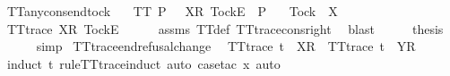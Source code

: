 \begin{isabellebody}
{\isafoldproof}%
%
\isadelimproof
\isanewline
%
\endisadelimproof
\isanewline
{}\isamarkupfalse%
\ TT{}{\isacharunderscore}any{\isacharunderscore}cons{\isacharunderscore}end{\isacharunderscore}tock{\isacharcolon}\isanewline
\ \ \ {\isachardoublequoteopen}TT{}\ P{\isachardoublequoteclose}\ {\isachardoublequoteopen}{\isasymrho}\ {\isacharat}\ {\isacharbrackleft}{\isacharbrackleft}X{\isacharbrackright}\isactrlsub R{\isacharcomma}\ {\isacharbrackleft}Tock{\isacharbrackright}\isactrlsub E{\isacharbrackright}\ {\isasymin}\ P{\isachardoublequoteclose}\isanewline
\ \ \ {\isachardoublequoteopen}Tock\ {\isasymnotin}\ X{\isachardoublequoteclose}\isanewline
%
\isadelimproof
%
\endisadelimproof
%
\isatagproof
{}\isamarkupfalse%
\ {\isacharminus}\isanewline
\ \ \isamarkupfalse%
\ {\isachardoublequoteopen}TT{}{\isacharunderscore}trace\ {\isacharparenleft}{\isacharbrackleft}{\isacharbrackleft}X{\isacharbrackright}\isactrlsub R{\isacharcomma}\ {\isacharbrackleft}Tock{\isacharbrackright}\isactrlsub E{\isacharbrackright}{\isacharparenright}{\isachardoublequoteclose}\isanewline
\ \ \ \ \isamarkupfalse%
\ assms\ TT{}{\isacharunderscore}def\ TT{}{\isacharunderscore}trace{\isacharunderscore}cons{\isacharunderscore}right\ \isamarkupfalse%
\ blast\isanewline
\ \ \isamarkupfalse%
\ \isamarkupfalse%
\ {\isacharquery}thesis\isanewline
\ \ \ \ \isamarkupfalse%
\ simp\isanewline
{}\isamarkupfalse%
%
\endisatagproof
{\isafoldproof}%
%
\isadelimproof
\isanewline
%
\endisadelimproof
\isanewline
{}\isamarkupfalse%
\ TT{}{\isacharunderscore}trace{\isacharunderscore}end{\isacharunderscore}refusal{\isacharunderscore}change{\isacharcolon}\isanewline
\ \ {\isachardoublequoteopen}TT{}{\isacharunderscore}trace\ {\isacharparenleft}t\ {\isacharat}\ {\isacharbrackleft}{\isacharbrackleft}X{\isacharbrackright}\isactrlsub R{\isacharbrackright}{\isacharparenright}\ {\isasymLongrightarrow}\ TT{}{\isacharunderscore}trace\ {\isacharparenleft}t\ {\isacharat}\ {\isacharbrackleft}{\isacharbrackleft}Y{\isacharbrackright}\isactrlsub R{\isacharbrackright}{\isacharparenright}{\isachardoublequoteclose}\isanewline
%
\isadelimproof
\ \ %
\endisadelimproof
%
\isatagproof
{}\isamarkupfalse%
\ {\isacharparenleft}induct\ t\ rule{\isacharcolon}TT{}{\isacharunderscore}trace{\isachardot}induct{\isacharcomma}\ auto{\isacharcomma}\ case{\isacharunderscore}tac\ x{\isacharcomma}\ auto{\isacharparenright}%

\end{isabellebody}
